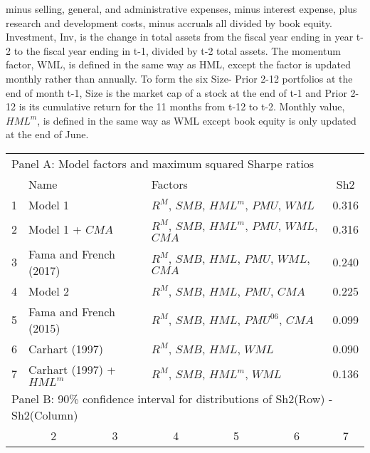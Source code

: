 \begin{table}[!ht]
{{minus selling, general, and administrative expenses, minus interest expense,
plus research and development costs, minus accruals all divided by book equity.
Investment, Inv, is the change in total assets from the fiscal year ending in
year t-2 to the fiscal year ending in t-1, divided by t-2 total assets. The
momentum factor, WML, is defined in the same way as HML, except the factor is
updated monthly rather than annually. To form the six Size- Prior 2-12
portfolios at the end of month t-1, Size is the market cap of a stock at the
end of t-1 and Prior 2-12 is its cumulative return for the 11 months from t-12
to t-2. Monthly value, $HML^m$, is defined in the same way as WML except book
equity is only updated at the end of June.
}
}
\begin{tabular}{lcccccc}
  \toprule
  \multicolumn{7}{l}{Panel A: Model factors and maximum squared Sharpe ratios} \\
        & \multicolumn{2}{l}{Name}                         & \multicolumn{3}{l}{Factors}                                   & Sh2   \\
  1     & \multicolumn{2}{l}{Model 1}                      & \multicolumn{3}{l}{$R^M$, $SMB$, $HML^m$, $PMU$, $WML$}        & 0.316 \\
  2     & \multicolumn{2}{l}{Model 1 + $CMA$}              & \multicolumn{3}{l}{$R^M$, $SMB$, $HML^m$, $PMU$, $WML$, $CMA$} & 0.316 \\
  3     & \multicolumn{2}{l}{Fama and French (2017)}       & \multicolumn{3}{l}{$R^M$, $SMB$, $HML$, $PMU$, $WML$, $CMA$}   & 0.240 \\
  4     & \multicolumn{2}{l}{Model 2}                      & \multicolumn{3}{l}{$R^M$, $SMB$, $HML$, $PMU$, $CMA$}          & 0.225 \\
  5     & \multicolumn{2}{l}{Fama and French (2015)}       & \multicolumn{3}{l}{$R^M$, $SMB$, $HML$, $PMU^{06}$, $CMA$}     & 0.099 \\
  6     & \multicolumn{2}{l}{Carhart (1997)}               & \multicolumn{3}{l}{$R^M$, $SMB$, $HML$, $WML$}                 & 0.090 \\
  7     & \multicolumn{2}{l}{Carhart (1997) + $HML^m$}    & \multicolumn{3}{l}{$R^M$, $SMB$, $HML^m$, $WML$}               & 0.136 \\
  \midrule
  \multicolumn{7}{l}{Panel B: 90\% confidence interval for distributions of Sh2(Row) - Sh2(Column)} \\
        &        2         &        3         &        4         &        5         &        6         &        7         \\

\end{tabular}
\end{table}
